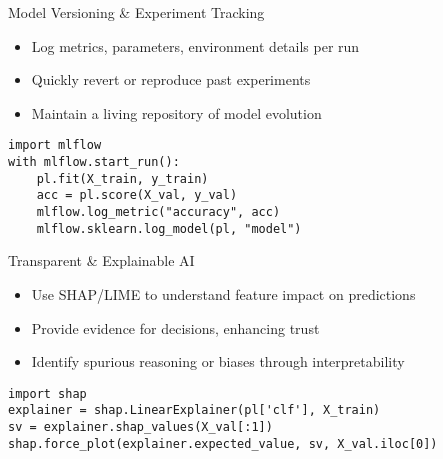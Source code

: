 \documentclass[aspectratio=169]{beamer}
\begin{document}

\begin{frame}[fragile]{Model Versioning \& Experiment Tracking}
\begin{itemize}
\item Log metrics, parameters, environment details per run
\item Quickly revert or reproduce past experiments
\item Maintain a living repository of model evolution
\end{itemize}

\begin{verbatim}
import mlflow
with mlflow.start_run():
    pl.fit(X_train, y_train)
    acc = pl.score(X_val, y_val)
    mlflow.log_metric("accuracy", acc)
    mlflow.sklearn.log_model(pl, "model")
\end{verbatim}
\end{frame}


\begin{frame}[fragile]{Transparent \& Explainable AI}
\begin{itemize}
\item Use SHAP/LIME to understand feature impact on predictions
\item Provide evidence for decisions, enhancing trust
\item Identify spurious reasoning or biases through interpretability
\end{itemize}

\begin{verbatim}
import shap
explainer = shap.LinearExplainer(pl['clf'], X_train)
sv = explainer.shap_values(X_val[:1])
shap.force_plot(explainer.expected_value, sv, X_val.iloc[0])
\end{verbatim}
\end{frame}
\end{document}
